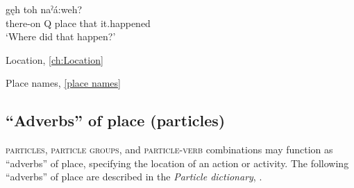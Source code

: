 \ea\label{ex:advex190}
 \gll {} gęh  toh naˀá:weh? \\
there-on Q place that it.happened\\
\glt ‘Where did that happen?’
\z

\begin{CayugaRelated}
\item Location, \ref{ch:Location}

\item Place names, \ref{place names}
\end{CayugaRelated}

\subsection{“Adverbs” of place (particles)} \label{‘Adverbs’ of place (particles)}
\textsc{particles}, \textsc{particle groups}, and \textsc{particle}-\textsc{verb} combinations may function as “adverbs” of place, specifying the location of an action or activity. The following “adverbs” of place are described in the \textit{Particle dictionary}, .

